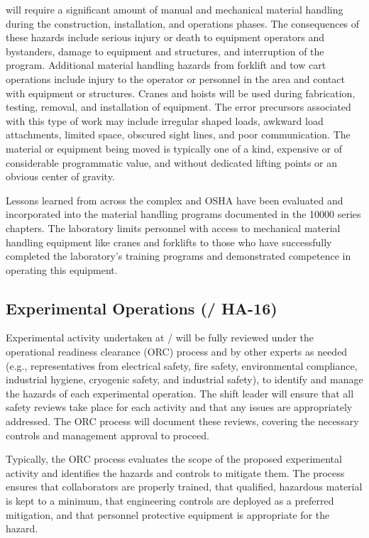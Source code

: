  will require a significant amount of manual and mechanical
material handling during the construction, installation, and operations
phases.  The consequences of these hazards include serious injury or
death to equipment operators and bystanders, damage to equipment and
structures, and interruption of the program.  Additional material
handling hazards from forklift and tow cart operations include injury
to the operator or personnel in the area and contact with equipment or
structures. Cranes and hoists will be used during fabrication,
testing, removal, and installation of equipment. The error precursors
associated with this type of work may include irregular shaped loads,
awkward load attachments, limited space, obscured sight lines, and
poor communication.  The material or equipment being moved is
typically one of a kind, expensive or of considerable programmatic
value, and without dedicated lifting points or an obvious center
of gravity.

Lessons learned from across the  complex and OSHA have been
evaluated and incorporated into the \fnal material handling
programs documented in the  10000 series chapters.  The
laboratory limits personnel with access to mechanical material
handling equipment like cranes and forklifts to those who have
successfully completed the laboratory's training programs and
demonstrated competence in operating this equipment.


\subsection{Experimental Operations (/ HA-16)}

Experimental activity undertaken at / will be fully reviewed
under the operational readiness clearance (ORC) process and by other
experts as needed (e.g., representatives from
electrical safety, fire safety, environmental compliance, industrial
hygiene, cryogenic safety, and industrial safety), to identify and
manage the hazards of each experimental operation. The shift leader
will ensure that all safety reviews take place for each
activity and that any issues are appropriately addressed. The ORC
process will document these reviews, covering the necessary controls
and management approval to proceed.

Typically, the ORC process evaluates the scope of the proposed
experimental activity and identifies the hazards and controls to
mitigate them. The process ensures that collaborators are properly trained, that
qualified, hazardous material is kept to a minimum, that engineering
controls are deployed as a preferred mitigation, and that personnel
protective equipment is appropriate for the hazard.


